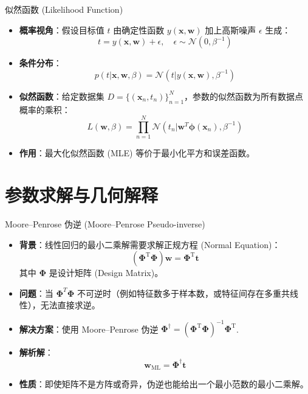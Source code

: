 \documentclass[12pt, aspectratio=169]{beamer}
\newcommand{\vect}[1]{\mathbf{#1}}
\newcommand{\N}{\mathcal{N}}
\begin{document}
\begin{frame}{似然函数 (Likelihood Function)}
    \begin{itemize}
        \item \textbf{概率视角}：假设目标值 $t$ 由确定性函数 $y(\vect{x}, \vect{w})$ 加上高斯噪声 $\epsilon$ 生成：
        $$ t = y(\vect{x}, \vect{w}) + \epsilon, \quad \epsilon \sim \N(0, \beta^{-1}) $$
        \item \textbf{条件分布}：
        $$ p(t|\vect{x}, \vect{w}, \beta) = \N(t | y(\vect{x}, \vect{w}), \beta^{-1}) $$
        \item \textbf{似然函数}：给定数据集 $D = \{(\vect{x}_n, t_n)\}_{n=1}^N$，参数的似然函数为所有数据点概率的乘积：
        $$ L(\vect{w}, \beta) = \prod_{n=1}^N \N(t_n | \vect{w}^T \boldsymbol{\phi}(\vect{x}_n), \beta^{-1}) $$
        \item \textbf{作用}：最大化似然函数 (MLE) 等价于最小化平方和误差函数。
    \end{itemize}
\end{frame}

\section{参数求解与几何解释}

\begin{frame}{Moore–Penrose 伪逆 (Moore–Penrose Pseudo-inverse)}
    \begin{itemize}
        \item \textbf{背景}：线性回归的最小二乘解需要求解正规方程 (Normal Equation)：
        $$ (\boldsymbol{\Phi}^{\mathrm{T}} \boldsymbol{\Phi}) \vect{w} = \boldsymbol{\Phi}^{\mathrm{T}} \vect{t} $$
        其中 $\boldsymbol{\Phi}$ 是设计矩阵 (Design Matrix)。
        \item \textbf{问题}：当 $\boldsymbol{\Phi}^T \boldsymbol{\Phi}$ 不可逆时（例如特征数多于样本数，或特征间存在多重共线性），无法直接求逆。
        \item \textbf{解决方案}：使用 Moore–Penrose 伪逆 
        $\boldsymbol{\Phi}^\dagger = (\boldsymbol{\Phi}^{\mathrm{T}}\boldsymbol{\Phi})^{-1}\boldsymbol{\Phi}^{\mathrm{T}}$.
        \item \textbf{解析解}：
        $$ \vect{w}_{\text{ML}} = \boldsymbol{\Phi}^\dagger \vect{t} $$
        \item \textbf{性质}：即使矩阵不是方阵或奇异，伪逆也能给出一个最小范数的最小二乘解。
    \end{itemize}
\end{frame}
\end{document}
